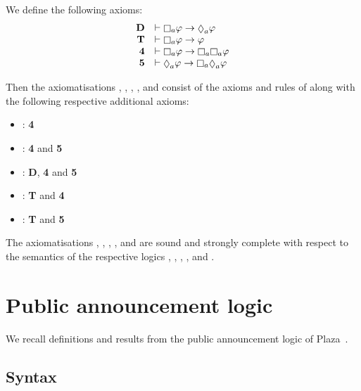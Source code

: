 \begin{definition}
We define the following axioms:
$$
\begin{array}{rl}
    {\bf D}     & \proves \necessary[\agentA] \phi \implies \possible[\agentA] \phi\\
    {\bf T}     & \proves \necessary[\agentA] \phi \implies \phi\\
    {\bf 4}     & \proves \necessary[\agentA] \phi \implies \necessary[\agentA] \necessary[\agentA] \phi\\
    {\bf 5}     & \proves \possible[\agentA] \phi \implies \necessary[\agentA] \possible[\agentA] \phi
\end{array}
$$

Then the axiomatisations \axiomKF{}, \axiomKFF{}, \axiomKD{}, \axiomSF{}, and \axiomS{} consist of the axioms and rules of \axiomK{} along with the following respective additional axioms:
\begin{itemize}
    \item \axiomKF{}: {\bf 4}
    \item \axiomKFF{}: {\bf 4} and {\bf 5}
    \item \axiomKD{}: {\bf D}, {\bf 4} and {\bf 5}
    \item \axiomSF{}: {\bf T} and {\bf 4}
    \item \axiomS{}: {\bf T} and {\bf 5}
\end{itemize}
\end{definition}

\begin{proposition}
The axiomatisations \axiomKF{}, \axiomKFF{}, \axiomKD{}, \axiomSF{}, and \axiomS{} are sound and strongly complete with respect to the semantics of the respective logics \logicKF{}, \logicKFF{}, \logicKD{}, \logicSF{}, and \logicS{}.
\end{proposition}

\section{Public announcement logic}

We recall definitions and results from the public announcement logic of Plaza~\cite{plaza:1989}.

\subsection{Syntax}

